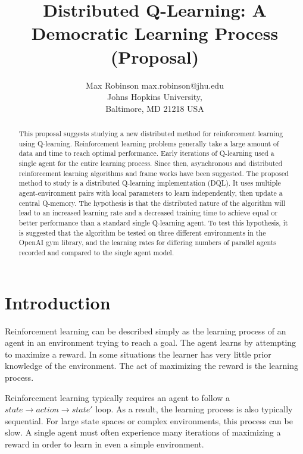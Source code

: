 \documentclass[jair,twoside,11pt,theapa]{article}
\begin{document}
\title{Distributed Q-Learning: A Democratic Learning Process (Proposal)}

\author{\name Max Robinson \email max.robinson@jhu.edu \\
       \addr Johns Hopkins University,\\
       Baltimore, MD 21218 USA
   }


\maketitle

\begin{abstract}
This proposal suggests studying a new distributed method for reinforcement learning using Q-learning. Reinforcement learning problems generally take a large amount of data and time to reach optimal performance. Early iterations of Q-learning used a single agent for the entire learning process. Since then, asynchronous and distributed reinforcement learning algorithms and frame works have been suggested. The proposed method to study is a distributed Q-learning implementation (DQL). It uses multiple agent-environment pairs with local parameters to learn independently, then update a central Q-memory. The hypothesis is that the distributed nature of the algorithm will lead to an increased learning rate and a decreased training time to achieve equal or better performance than a standard single Q-learning agent. To test this hypothesis, it is suggested that the algorithm be tested on three different environments in the OpenAI gym library, and the learning rates for differing numbers of parallel agents recorded and compared to the single agent model. 
\end{abstract}

\section{Introduction}
\label{Introduction}
Reinforcement learning can be described simply as the learning process of an agent in an environment trying to reach a goal. 
The agent learns by attempting to maximize a reward. In some situations the learner has very little prior knowledge of the environment. 
The act of maximizing the reward is the learning process.

Reinforcement learning typically requires an agent to follow a $state \to action \to state'$ loop. As a result, the learning process is also typically sequential. 
For large state spaces or complex environments, this process can be slow. A single agent must often experience many iterations of maximizing 
a reward in order to learn in even a simple environment.
\end{document}
